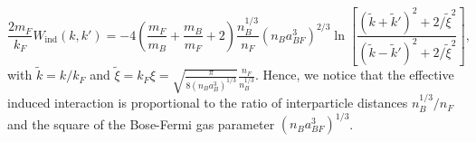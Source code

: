 \begin{equation}
\frac{2m_F}{k_F} W_{\text{ind}}(k,k') = - 4\left( \frac{m_F}{m_B} + \frac{m_B}{m_F} + 2 \right) \frac{n_B^{1/3}}{n_F}(n_Ba_{BF}^3)^{2/3} \ln\left[\frac{(\tilde{k}+\tilde{k}')^2+2/\tilde{\xi}^2}{(\tilde{k}-\tilde{k}')^2+2/\tilde{\xi}^2}\right],
\label{eq.EffectiveInteractionlt=0dimensionless} 
\end{equation}
with $\tilde{k} = k/k_F$ and $\tilde{\xi} = k_F\xi = \sqrt{ \frac{ \pi }{ 8(n_Ba_B^3)^{1/3} } } \frac{n_F}{n_B^{1/3}}$. Hence, we notice that the effective induced interaction is proportional to the ratio of interparticle distances $n_B^{1/3}/n_F$ and the square of the Bose-Fermi gas parameter $(n_Ba_{BF}^3)^{1/3}$. 
